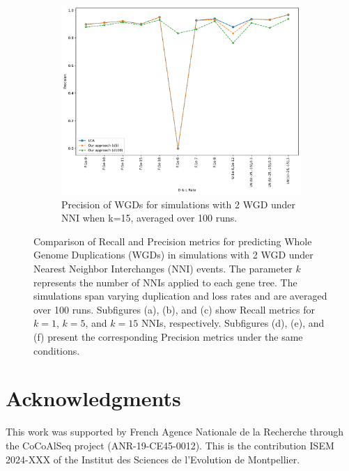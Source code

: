 \documentclass[10pt]{article}
\begin{document}
\begin{figure}[h!]
\begin{subfigure}[b]{0.31\textwidth}
        \label{fig:precision-NNI-k5-2wgd}
    \end{subfigure}
    \hfill
    \begin{subfigure}[b]{0.31\textwidth}
        \centering
        \includegraphics[width=\textwidth]{figs/precision-2W-NNI-K15-WGD-t20-t80-Avg.pdf}
        \caption{Precision of WGDs for simulations with 2 WGD under NNI when k=15, averaged over 100 runs.}
        \label{fig:precision-NNI-k15-2wgd}
    \end{subfigure}
    
    \caption{
        Comparison of Recall and Precision metrics for predicting Whole Genome Duplications (WGDs) in simulations with 2 WGD under Nearest Neighbor Interchanges (NNI) events. The parameter $k$ represents the number of NNIs applied to each gene tree. The simulations span varying duplication and loss rates and are averaged over 100 runs. Subfigures (a), (b), and (c) show Recall metrics for $k=1$, $k=5$, and $k=15$ NNIs, respectively. Subfigures (d), (e), and (f) present the corresponding Precision metrics under the same conditions.
    }
    \label{fig:recall-precision-2wgd-NNI}
\end{figure}

\newpage






\section{Acknowledgments}
This work was supported by French Agence Nationale de la Recherche through the CoCoAlSeq project (ANR-19-CE45-0012). This is the contribution ISEM 2024-XXX of the Institut des Sciences de l’Evolution de Montpellier.




\end{document}
